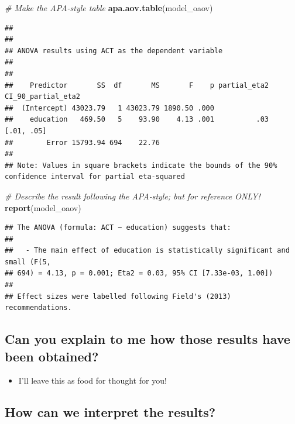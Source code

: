\documentclass[
]{book}
\newenvironment{Shaded}{\begin{snugshade}}{\end{snugshade}}
\newcommand{\CommentTok}[1]{\textcolor[rgb]{0.56,0.35,0.01}{\textit{#1}}}
\newcommand{\FunctionTok}[1]{\textcolor[rgb]{0.13,0.29,0.53}{\textbf{#1}}}
\newcommand{\NormalTok}[1]{#1}
\providecommand{\tightlist}{%
  \setlength{\itemsep}{0pt}\setlength{\parskip}{0pt}}
\begin{document}
\begin{Shaded}
\begin{Highlighting}[]
\CommentTok{\# Make the APA{-}style table}
\FunctionTok{apa.aov.table}\NormalTok{(model\_oaov)}
\end{Highlighting}
\end{Shaded}

\begin{verbatim}
## 
## 
## ANOVA results using ACT as the dependent variable
##  
## 
##    Predictor       SS  df       MS       F    p partial_eta2 CI_90_partial_eta2
##  (Intercept) 43023.79   1 43023.79 1890.50 .000                                
##    education   469.50   5    93.90    4.13 .001          .03         [.01, .05]
##        Error 15793.94 694    22.76                                             
## 
## Note: Values in square brackets indicate the bounds of the 90% confidence interval for partial eta-squared
\end{verbatim}

\begin{Shaded}
\begin{Highlighting}[]
\CommentTok{\# Describe the result following the APA{-}style; but for reference ONLY!}
\FunctionTok{report}\NormalTok{(model\_oaov)}
\end{Highlighting}
\end{Shaded}

\begin{verbatim}
## The ANOVA (formula: ACT ~ education) suggests that:
## 
##   - The main effect of education is statistically significant and small (F(5,
## 694) = 4.13, p = 0.001; Eta2 = 0.03, 95% CI [7.33e-03, 1.00])
## 
## Effect sizes were labelled following Field's (2013) recommendations.
\end{verbatim}

\subsection{Can you explain to me how those results have been obtained?}\label{can-you-explain-to-me-how-those-results-have-been-obtained}

\begin{itemize}
\tightlist
\item
  I'll leave this as food for thought for you!
\end{itemize}

\subsection{How can we interpret the results?}\label{how-can-we-interpret-the-results}
\end{document}
